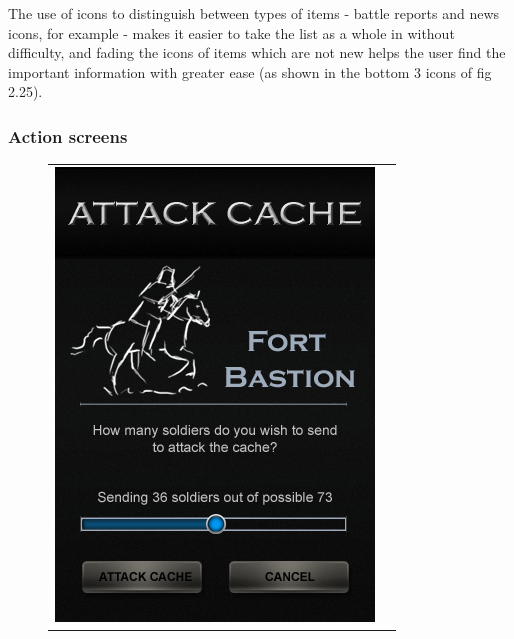 The use of icons to distinguish between types of items - battle reports and news icons, for example - makes it easier to take the list as a whole in without difficulty, and fading the icons of items which are not new helps the user find the important information with greater ease (as shown in the bottom 3 icons of fig 2.25).

\subsubsection{Action screens}

\begin{figure}[h!]
\centering
\begin{tabular}{cc}
	\begin{minipage}{0.3\textwidth}
		\begin{center}
		\begin{minipage}{0.83\textwidth}
		\includegraphics[width=\textwidth]{images/attack_cache_mockup}

\end{minipage}
\end{center}
\end{minipage}
\end{tabular}
\end{figure}
